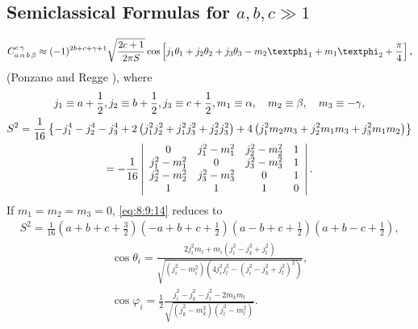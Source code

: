 \subsection{Semiclassical Formulas for $a, b, c \gg 1$}\label{sec:8.9.3}
\begin{equation}
\clebsch{a}{\alpha}{b}{\beta}{c}{\gamma} \approx(-1)^{2 b+c+\gamma+1} \sqrt{\frac{2 c+1}{2 \pi S}} \cos \left[j_{1} \theta_{1}+j_{2} \theta_{2}+j_{3} \theta_{3}-m_{2} \varphi_{1}+m_{1} \varphi_{2}+\frac{\pi}{4}\right], \label{eq:8:9:12}
\end{equation}
(Ponzano and Regge \cite{ref089}), where
\begin{gather}
j_{1} \equiv a+\frac{1}{2}, j_{2} \equiv b+\frac{1}{2}, j_{3} \equiv c+\frac{1}{2}, m_{1} \equiv \alpha, \quad m_{2} \equiv \beta, \quad m_{3} \equiv-\gamma, \label{eq:8:9:13}\\
S^{2}=\frac{1}{16}\left\{-j_{1}^{4}-j_{2}^{4}-j_{3}^{4}+2\left(j_{1}^{2} j_{2}^{2}+j_{1}^{2} j_{3}^{2}+j_{2}^{2} j_{3}^{2}\right)+4\left(j_{1}^{2} m_{2} m_{3}+j_{2}^{2} m_{1} m_{3}+j_{3}^{2} m_{1} m_{2}\right)\right\}  \notag\\
=-\frac{1}{16}\left|\begin{array}{cccc}
0 & j_{1}^{2}-m_{1}^{2} & j_{2}^{2}-m_{2}^{2} & 1 \\
j_{1}^{2}-m_{1}^{2} & 0 & j_{3}^{2}-m_{3}^{2} & 1 \\
j_{2}^{2}-m_{2}^{2} & j_{3}^{2}-m_{3}^{2} & 0 & 1 \\
1 & 1 & 1 & 0
\end{array}\right| . \label{eq:8:9:14}
\end{gather}
If $m_{1}=m_{2}=m_{3}=0$, \eqref{eq:8:9:14} reduces to
\begin{gather}
S^{2}=\frac{1}{16}\left(a+b+c+\frac{3}{2}\right)\left(-a+b+c+\frac{1}{2}\right)\left(a-b+c+\frac{1}{2}\right)\left(a+b-c+\frac{1}{2}\right), \label{eq:8:9:15}
\end{gather}
\begin{equation}\begin{gathered}
\cos \theta_{i}=\frac{2 j_{i}^{2} m_{l}+m_{i}\left(j_{i}^{2}-j_{k}^{2}+j_{l}^{2}\right)}{\sqrt{\left(j_{i}^{2}-m_{i}^{2}\right)\left(4 j_{i}^{2} j_{l}^{2}-\left(j_{i}^{2}-j_{k}^{2}+j_{l}^{2}\right)^{2}\right)}}, \\
\cos \varphi_{i}=\frac{1}{2} \frac{j_{i}^{2}-j_{k}^{2}-j_{l}^{2}-2 m_{k} m_{l}}{\sqrt{\left(j_{k}^{2}-m_{k}^{2}\right)\left(j_{l}^{2}-m_{l}^{2}\right)}}. 
\end{gathered} \label{eq:8:9:16}
\end{equation}
